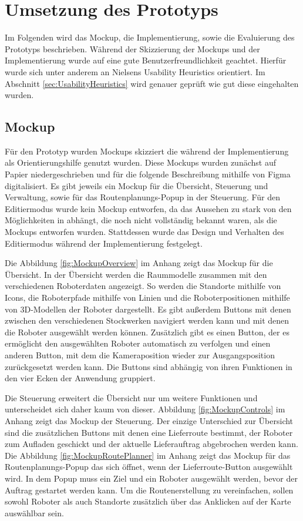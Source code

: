 
\newpage
\section{Umsetzung des Prototyps}\label{sec:RealizationOfPrototype}
Im Folgenden wird das Mockup, die Implementierung, sowie die Evaluierung des Prototyps beschrieben. Während der Skizzierung der Mockups und der Implementierung wurde auf eine gute Benutzerfreundlichkeit geachtet. Hierfür wurde sich unter anderem an Nielsens Usability Heuristics \cite{Nielsen.1994} orientiert. Im Abschnitt \ref{sec:UsabilityHeuristics} wird genauer geprüft wie gut diese eingehalten wurden.

\subsection{Mockup}\label{sec:Mockup}
Für den Prototyp wurden Mockups skizziert die während der Implementierung als Orientierungshilfe genutzt wurden. Diese Mockups wurden zunächst auf Papier niedergeschrieben und für die folgende Beschreibung mithilfe von Figma \cite{Figma} digitalisiert. Es gibt jeweils ein Mockup für die Übersicht, Steuerung und Verwaltung, sowie für das Routenplanungs-Popup in der Steuerung. Für den Editiermodus wurde kein Mockup entworfen, da das Aussehen zu stark von den Möglichkeiten in \deckgl{} abhängt, die noch nicht vollständig bekannt waren, als die Mockups entworfen wurden. Stattdessen wurde das Design und Verhalten des Editiermodus während der Implementierung festgelegt.

Die Abbildung \ref{fig:MockupOverview} im Anhang zeigt das Mockup für die Übersicht. In der Übersicht werden die Raummodelle zusammen mit den verschiedenen Roboterdaten angezeigt. So werden die Standorte mithilfe von Icons, die Roboterpfade mithilfe von Linien und die Roboterpositionen mithilfe von 3D-Modellen der Roboter dargestellt. Es gibt außerdem Buttons mit denen zwischen den verschiedenen Stockwerken navigiert werden kann und mit denen die Roboter ausgewählt werden können. Zusätzlich gibt es einen Button, der es ermöglicht den ausgewählten Roboter automatisch zu verfolgen und einen anderen Button, mit dem die Kameraposition wieder zur Ausgangsposition zurückgesetzt werden kann. Die Buttons sind abhängig von ihren Funktionen in den vier Ecken der Anwendung gruppiert.

Die Steuerung erweitert die Übersicht nur um weitere Funktionen und unterscheidet sich daher kaum von dieser. Abbildung \ref{fig:MockupControls} im Anhang zeigt das Mockup der Steuerung. Der einzige Unterschied zur Übersicht sind die zusätzlichen Buttons mit denen eine Lieferroute bestimmt, der Roboter zum Aufladen geschickt und der aktuelle Lieferauftrag abgebrochen werden kann. Die Abbildung \ref{fig:MockupRoutePlanner} im Anhang zeigt das Mockup für das Routenplanungs-Popup das sich öffnet, wenn der Lieferroute-Button ausgewählt wird. In dem Popup muss ein Ziel und ein Roboter ausgewählt werden, bevor der Auftrag gestartet werden kann. Um die Routenerstellung zu vereinfachen, sollen sowohl Roboter als auch Standorte zusätzlich über das Anklicken auf der Karte auswählbar sein.

